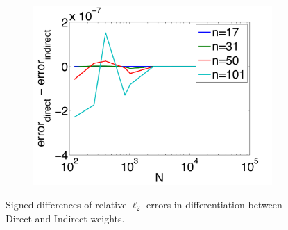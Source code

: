 \begin{figure}[htbp]
\begin{subfigure}[b]{0.425\textwidth}
	\includegraphics[width=1.0\textwidth]{figures/chapter2/compare_weight_generation/xsfc_vs_xsfc_alt_on_sph32_times_sine_20x/diff_of_rel_l2_errors.pdf}
	\end{subfigure}
	\caption{Signed differences of relative $\ell_{2}$ errors in differentiation between Direct and Indirect weights.}
\end{figure}


